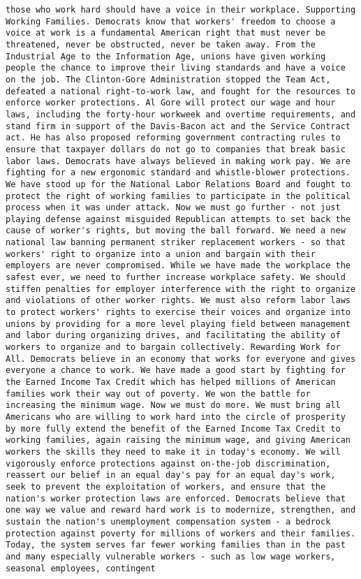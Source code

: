 \documentclass[
]{article}
\begin{document}
\begin{verbatim}
those who work hard should have a voice in their workplace. Supporting Working Families. Democrats know that workers' freedom to choose a voice at work is a fundamental American right that must never be threatened, never be obstructed, never be taken away. From the Industrial Age to the Information Age, unions have given working people the chance to improve their living standards and have a voice on the job. The Clinton-Gore Administration stopped the Team Act, defeated a national right-to-work law, and fought for the resources to enforce worker protections. Al Gore will protect our wage and hour laws, including the forty-hour workweek and overtime requirements, and stand firm in support of the Davis-Bacon act and the Service Contract act. He has also proposed reforming government contracting rules to ensure that taxpayer dollars do not go to companies that break basic labor laws. Democrats have always believed in making work pay. We are fighting for a new ergonomic standard and whistle-blower protections. We have stood up for the National Labor Relations Board and fought to protect the right of working families to participate in the political process when it was under attack. Now we must go further - not just playing defense against misguided Republican attempts to set back the cause of worker's rights, but moving the ball forward. We need a new national law banning permanent striker replacement workers - so that workers' right to organize into a union and bargain with their employers are never compromised. While we have made the workplace the safest ever, we need to further increase workplace safety. We should stiffen penalties for employer interference with the right to organize and violations of other worker rights. We must also reform labor laws to protect workers' rights to exercise their voices and organize into unions by providing for a more level playing field between management and labor during organizing drives, and facilitating the ability of workers to organize and to bargain collectively. Rewarding Work for All. Democrats believe in an economy that works for everyone and gives everyone a chance to work. We have made a good start by fighting for the Earned Income Tax Credit which has helped millions of American families work their way out of poverty. We won the battle for increasing the minimum wage. Now we must do more. We must bring all Americans who are willing to work hard into the circle of prosperity by more fully extend the benefit of the Earned Income Tax Credit to working families, again raising the minimum wage, and giving American workers the skills they need to make it in today's economy. We will vigorously enforce protections against on-the-job discrimination, reassert our belief in an equal day's pay for an equal day's work, seek to prevent the exploitation of workers, and ensure that the nation's worker protection laws are enforced. Democrats believe that one way we value and reward hard work is to modernize, strengthen, and sustain the nation's unemployment compensation system - a bedrock protection against poverty for millions of workers and their families. Today, the system serves far fewer working families than in the past and many especially vulnerable workers - such as low wage workers, seasonal employees, contingent 
\end{verbatim}
\end{document}
